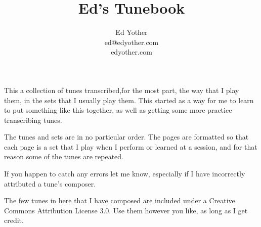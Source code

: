 \documentclass[12pt,letterpaper]{article}
\begin{document}

\title{Ed's Tunebook}
\author{Ed Yother\\ed@edyother.com\\edyother.com}
\maketitle

This a collection of tunes transcribed,for the most part, the way that I play them, in the sets that I usually play them. This started as a way for me to learn to put something like this together, as well as getting some more practice transcribing tunes. 

The tunes and sets are in no particular order. The pages are formatted so that each page is a set that I play when I perform or learned at a session, and for that reason some of the tunes are repeated.

If you happen to catch any errors let me know, especially if I have incorrectly attributed a tune's composer.

The few tunes in here that I have composed are included under a Creative Commons Attribution License 3.0. Use them however you like, as long as I get credit.

\pagebreak
\tableofcontents


\newpage



\setcounter{page}{1}



\newpage
{}



\newpage
{}



\newpage
{}

\end{document}
